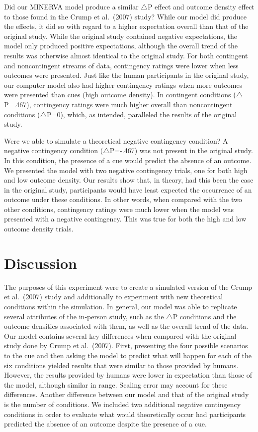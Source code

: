 \documentclass[
  english,
  man]{apa6}
\begin{document}
Did our MINERVA model produce a similar \(\triangle\)P effect and outcome density effect to those found in the Crump et al.~(2007) study? While our model did produce the effects, it did so with regard to a higher expectation overall than that of the original study. While the original study contained negative expectations, the model only produced positive expectations, although the overall trend of the results was otherwise almost identical to the original study. For both contingent and noncontingent streams of data, contingency ratings were lower when less outcomes were presented. Just like the human participants in the original study, our computer model also had higher contingency ratings when more outcomes were presented than cues (high outcome density). In contingent conditions (\(\triangle\)P=.467), contingency ratings were much higher overall than noncontingent conditions (\(\triangle\)P=0), which, as intended, paralleled the results of the original study.

Were we able to simulate a theoretical negative contingency condition? A negative contingency condition (\(\triangle\)P=-.467) was not present in the original study. In this condition, the presence of a cue would predict the absence of an outcome. We presented the model with two negative contingency trials, one for both high and low outcome density. Our results show that, in theory, had this been the case in the original study, participants would have least expected the occurrence of an outcome under these conditions. In other words, when compared with the two other conditions, contingency ratings were much lower when the model was presented with a negative contingency. This was true for both the high and low outcome density trials.

\hypertarget{discussion}{%
\section{Discussion}\label{discussion}}

The purposes of this experiment were to create a simulated version of the Crump et al.~(2007) study and additionally to experiment with new theoretical conditions within the simulation. In general, our model was able to replicate several attributes of the in-person study, such as the \(\triangle\)P conditions and the outcome densities associated with them, as well as the overall trend of the data.
Our model contains several key differences when compared with the original study done by Crump et al.~(2007). First, presenting the four possible scenarios to the cue and then asking the model to predict what will happen for each of the six conditions yielded results that were similar to those provided by humans. However, the results provided by humans were lower in expectation than those of the model, although similar in range. Scaling error may account for these differences. Another difference between our model and that of the original study is the number of conditions. We included two additional negative contingency conditions in order to evaluate what would theoretically occur had participants predicted the absence of an outcome despite the presence of a cue.
\end{document}
